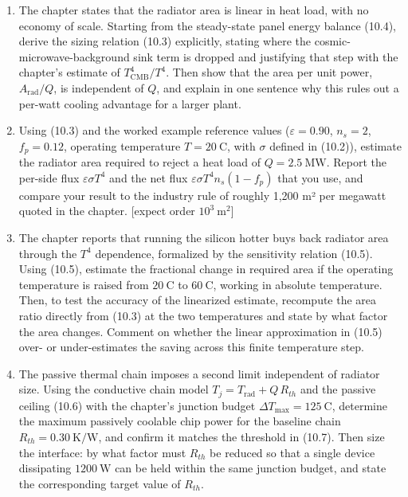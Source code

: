 \documentclass[
  11pt,
  openany,
  oneside]{book}
\begin{document}
\begin{enumerate}
\def\labelenumi{\arabic{enumi}.}
\item
  The chapter states that the radiator area is linear in heat load, with
  no economy of scale. Starting from the steady-state panel energy
  balance (10.4), derive the sizing relation (10.3) explicitly, stating
  where the cosmic-microwave-background sink term is dropped and
  justifying that step with the chapter's estimate of
  \(T_{\mathrm{CMB}}^4/T^4\). Then show that the area per unit power,
  \(A_{\mathrm{rad}}/Q\), is independent of \(Q\), and explain in one
  sentence why this rules out a per-watt cooling advantage for a larger
  plant.
\item
  Using (10.3) and the worked example reference values
  (\(\varepsilon = 0.90\), \(n_s = 2\), \(f_p = 0.12\), operating
  temperature \(T = 20\ \mathrm{C}\), with \(\sigma\) defined in
  (10.2)), estimate the radiator area required to reject a heat load of
  \(Q = 2.5\ \mathrm{MW}\). Report the per-side flux
  \(\varepsilon\sigma T^4\) and the net flux
  \(\varepsilon\sigma T^4 n_s (1 - f_p)\) that you use, and compare your
  result to the industry rule of roughly 1,200 m² per megawatt quoted in
  the chapter. {[}expect order \(10^3\ \mathrm{m^2}\){]}
\item
  The chapter reports that running the silicon hotter buys back radiator
  area through the \(T^4\) dependence, formalized by the sensitivity
  relation (10.5). Using (10.5), estimate the fractional change in
  required area if the operating temperature is raised from
  \(20\ \mathrm{C}\) to \(60\ \mathrm{C}\), working in absolute
  temperature. Then, to test the accuracy of the linearized estimate,
  recompute the area ratio directly from (10.3) at the two temperatures
  and state by what factor the area changes. Comment on whether the
  linear approximation in (10.5) over- or under-estimates the saving
  across this finite temperature step.
\item
  The passive thermal chain imposes a second limit independent of
  radiator size. Using the conductive chain model
  \(T_j = T_{\mathrm{rad}} + Q\,R_{th}\) and the passive ceiling (10.6)
  with the chapter's junction budget
  \(\Delta T_{\max} = 125\ \mathrm{C}\), determine the maximum passively
  coolable chip power for the baseline chain
  \(R_{th} = 0.30\ \mathrm{K/W}\), and confirm it matches the threshold
  in (10.7). Then size the interface: by what factor must \(R_{th}\) be
  reduced so that a single device dissipating \(1200\ \mathrm{W}\) can
  be held within the same junction budget, and state the corresponding
  target value of \(R_{th}\).
\end{enumerate}
\end{document}
